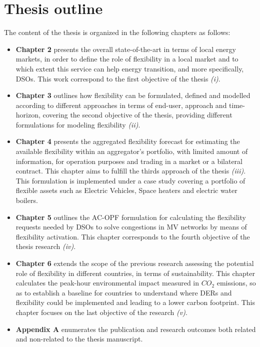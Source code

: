 \section{Thesis outline}
The content of the thesis is organized in the following chapters as follows:
\begin{itemize}
\item \textbf{Chapter 2} presents the overall state-of-the-art in terms of local energy markets, in order to define the role of flexibility in a local market and to which extent this service can help energy transition, and more specifically, DSOs. This work correspond to the first objective of the thesis \textit{(i)}. 
\item \textbf{Chapter 3} outlines how flexibility can be formulated, defined and modelled according to different approaches in terms of end-user, approach and time-horizon, covering the second objective of the thesis, providing different formulations for modeling flexibility \textit{(ii)}. 
\item \textbf{Chapter 4} presents the aggregated flexibility forecast for estimating the available flexibility within an aggregator's portfolio, with limited amount of information, for operation purposes and trading in a market or a bilateral contract. This chapter aims to fulfill the thirds approach of the thesis \textit{(iii)}. This formulation is implemented under a case study covering a portfolio of flexible assets such as Electric Vehicles, Space heaters and electric water boilers.  
\item \textbf{Chapter 5} outlines the AC-OPF formulation for calculating the flexibility requests needed by DSOs to solve congestions in MV networks by means of flexibility activation. This chapter corresponds to the fourth objective of the thesis research \textit{(iv)}.  
\item \textbf{Chapter 6} extends the scope of the previous research assessing the potential role of flexibility in different countries, in terms of sustainability. This chapter calculates the peak-hour environmental impact measured in $CO_2$ emissions, so as to establish a baseline for countries to understand where DERs and flexibility could be implemented and leading to a lower carbon footprint. This chapter focuses on the last objective of the research \textit{(v)}. 
\item \textbf{Appendix A} enumerates the publication and research outcomes both related and non-related to the thesis manuscript. 
\end{itemize}


